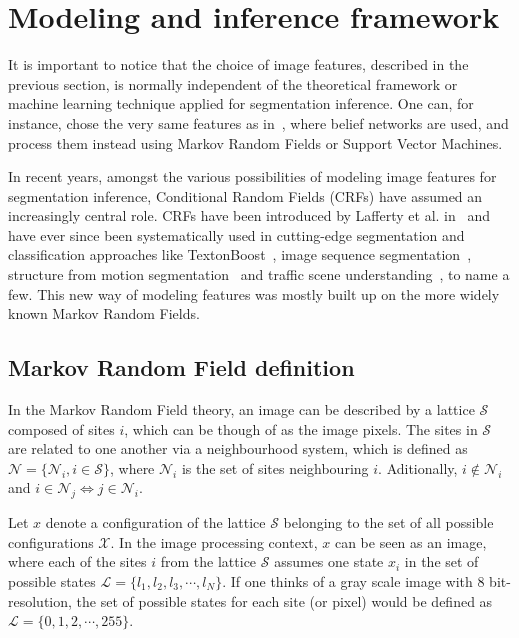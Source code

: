 \section{Modeling and inference framework} 

It is important to notice that the choice of image features, described in the previous section, is normally independent of the theoretical framework or machine learning technique applied for segmentation inference. One can, for instance, chose the very same features as in~\cite{feng:color_tex}, where belief networks are used, and process them instead using Markov Random Fields or Support Vector Machines.

In recent years, amongst the various possibilities of modeling image features for segmentation inference, Conditional Random Fields (CRFs) have assumed an increasingly central role. CRFs have been introduced by Lafferty et al. in~\cite{lafferty:crf} and have ever since been systematically used in cutting-edge segmentation and classification approaches like TextonBoost~\cite{jamie:texton_boost}, image sequence segmentation~\cite{wang:dynamic_CRFs}, structure from motion segmentation~\cite{brostow:structure_from_motion} and traffic scene understanding~\cite{ess:traffic_segmentation}, to name a few. This new way of modeling features was mostly built up on the more widely known Markov Random Fields. 

\subsection{Markov Random Field definition}

In the Markov Random Field theory, an image can be described by a lattice $\mathcal S$ composed of sites $i$, which can be though of as the image pixels. The sites in $\mathcal S$ are related to one another via a neighbourhood system, which is defined as ${\mathcal N}=\{{\mathcal N}_i, i \in \mathcal S\}$, where ${\mathcal N}_i$ is the set of sites neighbouring $i$. Aditionally, $i \notin {\mathcal N}_i$ and $i \in {\mathcal N}_j \Longleftrightarrow j \in {\mathcal N}_i$. 

Let $x$ denote a configuration of the lattice $\mathcal S$ belonging to the set of all possible configurations $\mathcal X$. In the image processing context, $x$ can be seen as an image, where each of the sites $i$ from the lattice $\mathcal S$ assumes one state $x_i$ in the set of possible states $\mathcal L = \{ l_1, l_2, l_3, \cdots, l_N\}$. If one thinks of a gray scale image with 8 bit-resolution, the set of possible states for each site (or pixel) would be defined as $\mathcal L = \{ 0, 1, 2, \cdots, 255\}$.

